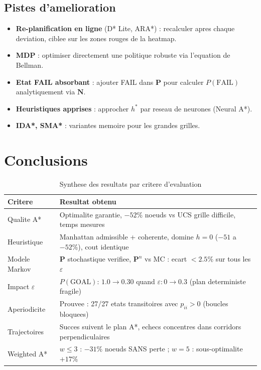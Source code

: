 \documentclass[11pt,a4paper]{article}
\begin{document}
\subsection{Pistes d'amelioration}
\begin{itemize}[leftmargin=1.4cm,itemsep=2pt]
  \item \textbf{Re-planification en ligne} (D* Lite, ARA*) : recalculer apres chaque deviation, ciblee sur les zones rouges de la heatmap.
  \item \textbf{MDP} : optimiser directement une politique robuste via l'equation de Bellman.
  \item \textbf{Etat FAIL absorbant} : ajouter FAIL dans $\mathbf{P}$ pour calculer $P(\text{FAIL})$ analytiquement via $\mathbf{N}$.
  \item \textbf{Heuristiques apprises} : approcher $h^*$ par reseau de neurones (Neural A*).
  \item \textbf{IDA*, SMA*} : variantes memoire pour les grandes grilles.
\end{itemize}

\section{Conclusions}

\begin{table}[H]
\centering\small
\caption{Synthese des resultats par critere d'evaluation}
\begin{tabular}{C{2.8cm}L{9.5cm}}
\toprule
{}
\color{white}\textbf{Critere}&\color{white}\textbf{Resultat obtenu}\\
\midrule
{}Qualite A*&Optimalite garantie, $-52\%$ noeuds vs UCS grille difficile, temps mesures\\
Heuristique&Manhattan admissible + coherente, domine $h=0$ ($-51$ a $-52\%$), cout identique\\
Modele Markov&$\mathbf{P}$ stochastique verifiee, $\mathbf{P}^n$ vs MC : ecart $<2.5\%$ sur tous les $\varepsilon$\\
Impact $\varepsilon$&$P(\text{GOAL})$: $1.0\to0.30$ quand $\varepsilon:0\to0.3$ (plan deterministe fragile)\\
Aperiodicite&Prouvee : 27/27 etats transitoires avec $p_{ii}>0$ (boucles bloquees)\\
Trajectoires&Succes suivent le plan A*, echecs concentres dans corridors perpendiculaires\\
Weighted A*&$w\leq3$ : $-31\%$ noeuds SANS perte ; $w=5$ : sous-optimalite $+17\%$\\
\bottomrule
\end{tabular}
\end{table}
\end{document}
